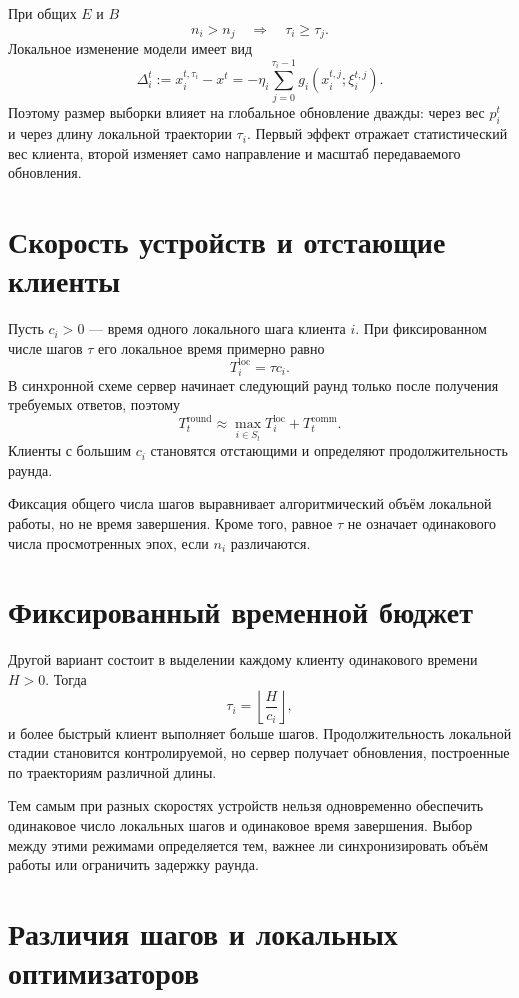 При общих \(E\) и \(B\)
\[
    n_i>n_j
    \quad\Longrightarrow\quad
    \tau_i\ge\tau_j.
\]
Локальное изменение модели имеет вид
\[
    \Delta_i^t
    :=
    x_i^{t,\tau_i}-x^t
    =
    -\eta_i
    \sum_{j=0}^{\tau_i-1}
    g_i
    \left(
        x_i^{t,j};\xi_i^{t,j}
    \right).
\]
Поэтому размер выборки влияет на глобальное обновление дважды: через
вес \(p_i^t\) и через длину локальной траектории \(\tau_i\). Первый
эффект отражает статистический вес клиента, второй изменяет само
направление и масштаб передаваемого обновления.

\section{Скорость устройств и отстающие клиенты}

Пусть \(c_i>0\) --- время одного локального шага клиента \(i\). При
фиксированном числе шагов \(\tau\) его локальное время примерно равно
\[
    T_i^{\mathrm{loc}}=\tau c_i.
\]
В синхронной схеме сервер начинает следующий раунд только после
получения требуемых ответов, поэтому
\[
    T_t^{\mathrm{round}}
    \approx
    \max_{i\in S_t}T_i^{\mathrm{loc}}
    +
    T_t^{\mathrm{comm}}.
\]
Клиенты с большим \(c_i\) становятся отстающими и определяют
продолжительность раунда.

Фиксация общего числа шагов выравнивает алгоритмический объём
локальной работы, но не время завершения. Кроме того, равное
\(\tau\) не означает одинакового числа просмотренных эпох, если
\(n_i\) различаются.

\section{Фиксированный временной бюджет}

Другой вариант состоит в выделении каждому клиенту одинакового
времени \(H>0\). Тогда
\[
    \tau_i
    =
    \left\lfloor\frac{H}{c_i}\right\rfloor,
\]
и более быстрый клиент выполняет больше шагов. Продолжительность
локальной стадии становится контролируемой, но сервер получает
обновления, построенные по траекториям различной длины.

Тем самым при разных скоростях устройств нельзя одновременно
обеспечить одинаковое число локальных шагов и одинаковое время
завершения. Выбор между этими режимами определяется тем, важнее ли
синхронизировать объём работы или ограничить задержку раунда.

\section{Различия шагов и локальных оптимизаторов}

